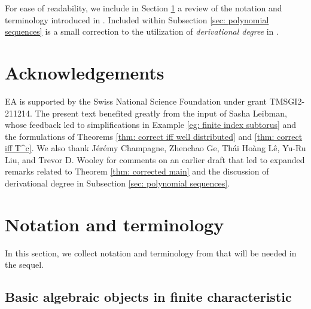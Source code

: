 \documentclass[11pt]{amsart}
\theoremstyle{theorem}
\theoremstyle{definition}
\begin{document}
For ease of readability, we include in Section \ref{sec: notation} a review of the notation and terminology introduced in \cite{bl}.
Included within Subsection \ref{sec: polynomial sequences} is a small correction to the utilization of \emph{derivational degree} in \cite{bl}.


\section*{Acknowledgements}

EA is supported by the Swiss National Science Foundation under grant TMSGI2-211214.
The present text benefited greatly from the input of Sasha Leibman, whose feedback led to simplifications in Example \ref{eg: finite index subtorus} and the formulations of Theorems \ref{thm: correct iff well distributed} and \ref{thm: correct iff T^c}.
We also thank J\'{e}r\'{e}my Champagne, Zhenchao Ge, Th\'{a}i Ho\`{a}ng L\^{e}, Yu-Ru Liu, and Trevor D. Wooley for comments on an earlier draft that led to expanded remarks related to Theorem \ref{thm: corrected main} and the discussion of derivational degree in Subsection \ref{sec: polynomial sequences}.


\section{Notation and terminology} \label{sec: notation}

In this section, we collect notation and terminology from \cite{bl} that will be needed in the sequel.


\subsection{Basic algebraic objects in finite characteristic}
\end{document}

